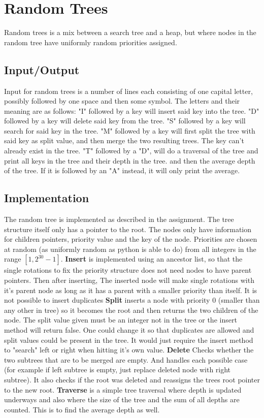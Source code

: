 \documentclass[12pt, a4paper]{article}
\begin{document}
\section*{Random Trees}
Random trees is a mix between a search tree and a heap, but where
nodes in the random tree have uniformly random priorities assigned.

\subsection*{Input/Output}
Input for random trees is a number of lines each consisting of one capital 
letter, possibly followed by one space and then some symbol.
The letters and their meaning are as follows: 
"I" followed by a key will insert said key into the tree.
"D" followed by a key will delete said key from the tree.
"S" followed by a key will search for said key in the tree.
"M" followed by a key will first split the tree with said key as split value,
and then merge the two resulting trees. The key can't already exist in the tree.
"T" followed by a "D", will do a traversal of the 
tree and print all keys in the tree and their depth in the tree. and then 
the average depth of the tree. If it is followed by an "A" instead, it will only
print the average.

\medskip

\subsection*{Implementation}
The random tree is implemented as described in the assignment. 
The tree structure itself only has a pointer to the root.
The nodes only have information for children pointers, priority value 
and the key of the node.
Priorities are chosen at random (as uniformly random as python is able to do)
from all integers in the range $[1,2^30-1]$.
\textbf{Insert} is implemented using an ancestor list, so that the single
rotations to fix the priority structure does not need nodes to have parent pointers.
Then after inserting, The inserted node will make single rotations with
it's parent node as long as it has a parent with a smaller priority than itself.
It is not possible to insert duplicates
\textbf{Split} inserts a node with priority 0 (smaller than any other in tree)
so it becomes the root and then returns the two children of the node.
The split value given must be an integer not in the tree or the insert method will return false.
One could change it so that duplicates are allowed and split values could 
be present in the tree. It would just require the insert method to "search" left or right when hitting it's own value.
\textbf{Delete} Checks whether the two subtrees that are to be merged are empty. And handles each possible case (for example if left subtree is empty, just 
replace deleted node with right subtree). 
It also checks if the root was deleted and reassigns the trees root pointer to
the new root.
\textbf{Traverse} is a simple tree traversal where depth is updated underways
and also where the size of the tree and the sum of all depths are counted. 
This is to find the average depth as well. 
\end{document}
